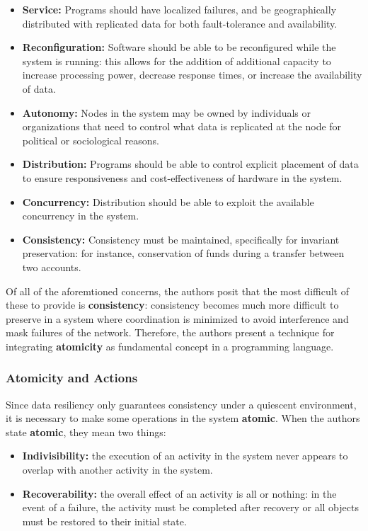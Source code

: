 \begin{itemize}
\item \textbf{Service:} Programs should have localized failures, and be geographically distributed with replicated data for both fault-tolerance and availability.
\item \textbf{Reconfiguration:} Software should be able to be reconfigured while the system is running: this allows for the addition of additional capacity to increase processing power, decrease response times, or increase the availability of data.
\item \textbf{Autonomy:} Nodes in the system may be owned by individuals or organizations that need to control what data is replicated at the node for political or sociological reasons.
\item \textbf{Distribution:} Programs should be able to control explicit placement of data to ensure responsiveness and cost-effectiveness of hardware in the system.
\item \textbf{Concurrency:} Distribution should be able to exploit the available concurrency in the system.
\item \textbf{Consistency:} Consistency must be maintained, specifically for invariant preservation: for instance, conservation of funds during a transfer between two accounts.
\end{itemize}

Of all of the aforemtioned concerns, the authors posit that the most difficult of these to provide is \textbf{consistency}: consistency becomes much more difficult to preserve in a system where coordination is minimized to avoid interference and mask failures of the network.  Therefore, the authors present a technique for integrating \textbf{atomicity} as fundamental concept in a programming language.

\subsubsection{Atomicity and Actions}

Since data resiliency only guarantees consistency under a quiescent environment, it is necessary to make some operations in the system \textbf{atomic}.  When the authors state \textbf{atomic}, they mean two things:

\begin{itemize}
\item \textbf{Indivisibility:} the execution of an activity in the system never appears to overlap with another activity in the system.
\item \textbf{Recoverability:} the overall effect of an activity is all or nothing: in the event of a failure, the activity must be completed after recovery or all objects must be restored to their initial state.	
\end{itemize}

